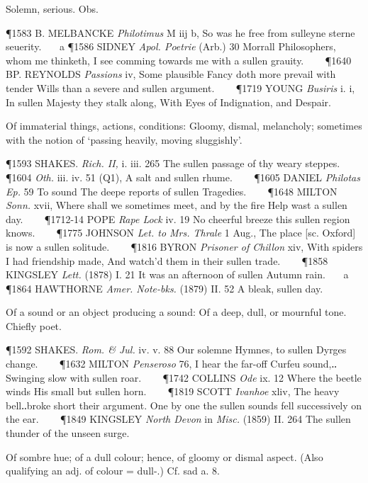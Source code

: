 \begin{description}[wide, labelwidth=!, labelindent=0pt]
\begin{myenumerate}
 Solemn, serious. Obs.

\P 1583 B. MELBANCKE  \textit{Philotimus} M iij b, So was he free from sulleyne sterne seuerity.    a 
\P 1586 SIDNEY  \textit{Apol. Poetrie} (Arb.) 30 Morrall Philosophers, whom me thinketh, I see comming towards me with a sullen grauity.    
\P 1640 BP. REYNOLDS  \textit{Passions} iv, Some plausible Fancy doth more prevail with tender Wills than a severe and sullen argument.    
\P 1719 YOUNG  \textit{Busiris} i. i, In sullen Majesty they stalk along, With Eyes of Indignation, and Despair.

 Of immaterial things, actions, conditions: Gloomy, dismal, melancholy; sometimes with the notion of ‘passing heavily, moving sluggishly’.

\P 1593 SHAKES.  \textit{Rich. II,} i. iii. 265 The sullen passage of thy weary steppes.    
\P 1604 \textit{Oth.} iii. iv. 51 (Q1), A salt and sullen rhume.    
\P 1605 DANIEL  \textit{Philotas Ep.} 59 To sound The deepe reports of sullen Tragedies.    
\P 1648 MILTON  \textit{Sonn.} xvii, Where shall we sometimes meet, and by the fire Help wast a sullen day.    
\P 1712-14 POPE  \textit{Rape Lock} iv. 19 No cheerful breeze this sullen region knows.    
\P 1775 JOHNSON  \textit{Let. to Mrs. Thrale} 1 Aug., The place [sc. Oxford] is now a sullen solitude.    
\P 1816 BYRON  \textit{Prisoner of Chillon} xiv, With spiders I had friendship made, And watch'd them in their sullen trade.    
\P 1858 KINGSLEY  \textit{Lett.} (1878) I. 21 It was an afternoon of sullen Autumn rain.    a 
\P 1864 HAWTHORNE  \textit{Amer. Note-bks.} (1879) II. 52 A bleak, sullen day.

 Of a sound or an object producing a sound: Of a deep, dull, or mournful tone. Chiefly poet.

\P 1592 SHAKES.  \textit{Rom. \& Jul.} iv. v. 88 Our solemne Hymnes, to sullen Dyrges change.    
\P 1632 MILTON  \textit{Penseroso} 76, I hear the far-off Curfeu sound,‥Swinging slow with sullen roar.    
\P 1742 COLLINS  \textit{Ode} ix. 12 Where the beetle winds His small but sullen horn.    
\P 1819 SCOTT  \textit{Ivanhoe} xliv, The heavy bell‥broke short their argument. One by one the sullen sounds fell successively on the ear.    
\P 1849 KINGSLEY  \textit{North Devon} in \textit{Misc.} (1859) II. 264 The sullen thunder of the unseen surge.

 Of sombre hue; of a dull colour; hence, of gloomy or dismal aspect. (Also qualifying an adj. of colour = dull-.) Cf. sad a. 8.


\end{myenumerate}
\end{description}
